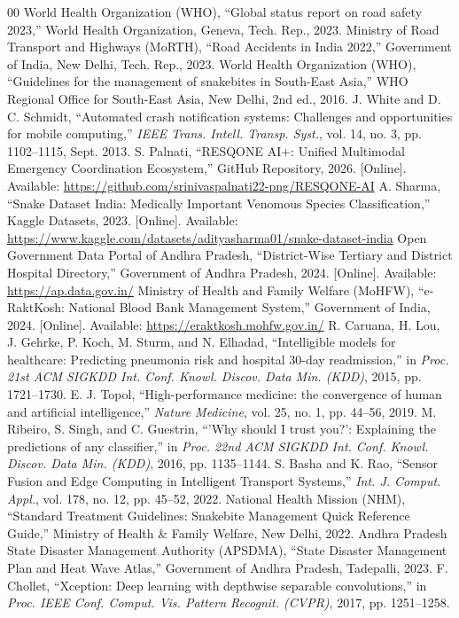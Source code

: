 \documentclass[conference]{IEEEtran}
\begin{document}
\begin{thebibliography}{00}
 World Health Organization (WHO), ``Global status report on road safety 2023,'' World Health Organization, Geneva, Tech. Rep., 2023.
 Ministry of Road Transport and Highways (MoRTH), ``Road Accidents in India 2022,'' Government of India, New Delhi, Tech. Rep., 2023.
 World Health Organization (WHO), ``Guidelines for the management of snakebites in South-East Asia,'' WHO Regional Office for South-East Asia, New Delhi, 2nd ed., 2016.
 J. White and D. C. Schmidt, ``Automated crash notification systems: Challenges and opportunities for mobile computing,'' \textit{IEEE Trans. Intell. Transp. Syst.}, vol. 14, no. 3, pp. 1102--1115, Sept. 2013.
 S. Palnati, ``RESQONE AI+: Unified Multimodal Emergency Coordination Ecosystem,'' GitHub Repository, 2026. [Online]. Available: \url{https://github.com/srinivaspalnati22-png/RESQONE-AI}
 A. Sharma, ``Snake Dataset India: Medically Important Venomous Species Classification,'' Kaggle Datasets, 2023. [Online]. Available: \url{https://www.kaggle.com/datasets/adityasharma01/snake-dataset-india}
 Open Government Data Portal of Andhra Pradesh, ``District-Wise Tertiary and District Hospital Directory,'' Government of Andhra Pradesh, 2024. [Online]. Available: \url{https://ap.data.gov.in/}
 Ministry of Health and Family Welfare (MoHFW), ``e-RaktKosh: National Blood Bank Management System,'' Government of India, 2024. [Online]. Available: \url{https://eraktkosh.mohfw.gov.in/}
 R. Caruana, H. Lou, J. Gehrke, P. Koch, M. Sturm, and N. Elhadad, ``Intelligible models for healthcare: Predicting pneumonia risk and hospital 30-day readmission,'' in \textit{Proc. 21st ACM SIGKDD Int. Conf. Knowl. Discov. Data Min. (KDD)}, 2015, pp. 1721--1730.
 E. J. Topol, ``High-performance medicine: the convergence of human and artificial intelligence,'' \textit{Nature Medicine}, vol. 25, no. 1, pp. 44--56, 2019.
 M. Ribeiro, S. Singh, and C. Guestrin, ``'Why should I trust you?': Explaining the predictions of any classifier,'' in \textit{Proc. 22nd ACM SIGKDD Int. Conf. Knowl. Discov. Data Min. (KDD)}, 2016, pp. 1135--1144.
 S. Basha and K. Rao, ``Sensor Fusion and Edge Computing in Intelligent Transport Systems,'' \textit{Int. J. Comput. Appl.}, vol. 178, no. 12, pp. 45--52, 2022.
 National Health Mission (NHM), ``Standard Treatment Guidelines: Snakebite Management Quick Reference Guide,'' Ministry of Health \& Family Welfare, New Delhi, 2022.
 Andhra Pradesh State Disaster Management Authority (APSDMA), ``State Disaster Management Plan and Heat Wave Atlas,'' Government of Andhra Pradesh, Tadepalli, 2023.
 F. Chollet, ``Xception: Deep learning with depthwise separable convolutions,'' in \textit{Proc. IEEE Conf. Comput. Vis. Pattern Recognit. (CVPR)}, 2017, pp. 1251--1258.
\end{thebibliography}
\end{document}
